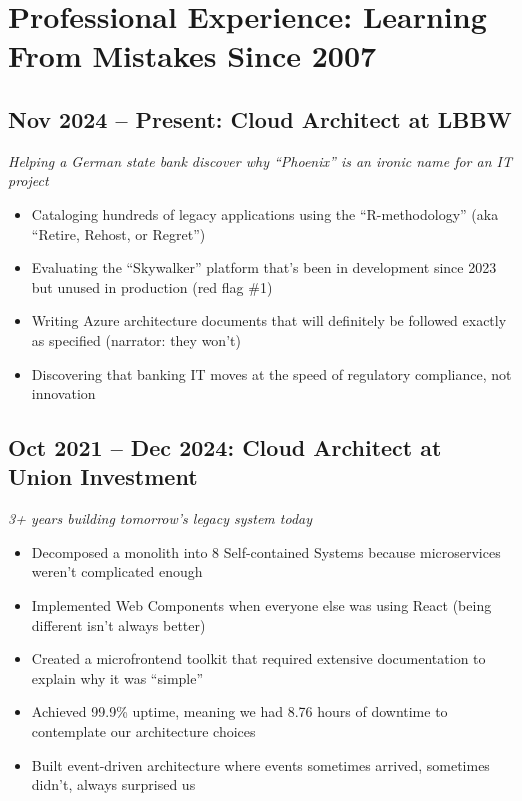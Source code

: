 \documentclass[10pt,a4paper]{article}
\begin{document}
\newpage

\section*{Professional Experience: Learning From Mistakes Since 2007}

\subsection*{Nov 2024 -- Present: Cloud Architect at LBBW}
\textit{Helping a German state bank discover why ``Phoenix'' is an ironic name for an IT project}
\begin{itemize}
\item Cataloging hundreds of legacy applications using the ``R-methodology'' (aka ``Retire, Rehost, or Regret'')
\item Evaluating the ``Skywalker'' platform that's been in development since 2023 but unused in production (red flag \#1)
\item Writing Azure architecture documents that will definitely be followed exactly as specified (narrator: they won't)
\item Discovering that banking IT moves at the speed of regulatory compliance, not innovation
\end{itemize}

\subsection*{Oct 2021 -- Dec 2024: Cloud Architect at Union Investment}
\textit{3+ years building tomorrow's legacy system today}
\begin{itemize}
\item Decomposed a monolith into 8 Self-contained Systems because microservices weren't complicated enough
\item Implemented Web Components when everyone else was using React (being different isn't always better)
\item Created a microfrontend toolkit that required extensive documentation to explain why it was ``simple''
\item Achieved 99.9\% uptime, meaning we had 8.76 hours of downtime to contemplate our architecture choices
\item Built event-driven architecture where events sometimes arrived, sometimes didn't, always surprised us
\end{itemize}
\end{document}

